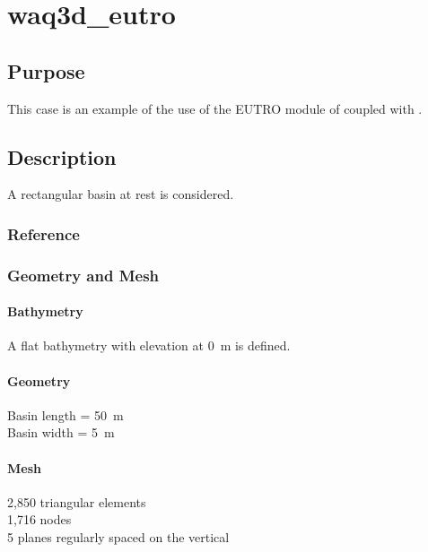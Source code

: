 \chapter{waq3d\_eutro}
%
%
\section{Purpose}
%
This case is an example of the use of the EUTRO module of \waqtel coupled with .
%
\section{Description}
%
A rectangular basin at rest is considered.
%
%
%
%
\subsection{Reference}
%

%
%
%
\subsection{Geometry and Mesh}
%
\subsubsection{Bathymetry}
%
A flat bathymetry with elevation at 0~m is defined.
%
\subsubsection{Geometry}
%
Basin length = 50~m\\
Basin width = 5~m
%
\subsubsection{Mesh}
%
2,850 triangular elements\\
1,716 nodes\\
5 planes regularly spaced on the vertical
%
%
%
